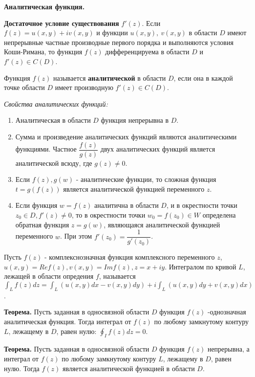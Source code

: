\textbf{Аналитическая функция.}

\textbf{Достаточное условие существования} $f'(z)$.
Если $f(z) = u(x, y) + iv(x, y)$ и функции $u(x, y),~v(x, y)$ в области $D$ имеют непрерывные частные производные первого порядка и выполняются условия Коши-Римана, то функция $f(z)$ дифференцируема в области $D$ и $f'(z) \in C(D)$.

Функция $f(z)$ называется \textbf{аналитической} в области $D$, если она в каждой точке области $D$ имеет производную $f'(z) \in C(D)$.

\textit{Свойства аналитических функций:}
\begin{enumerate}
    \item Аналитическая в области $D$ функция непрерывна в $D$.
    \item Сумма и произведение аналитических функций являются аналитическими функциями. Частное $\dfrac{f(z)}{g(z)}$ двух аналитических функций является аналитической всюду, где $g(z) \neq 0$.
    \item Если $f(z), g(w)$ - аналитические функции, то сложная функция $t = g(f(z))$ является аналитической функцией переменного $z$.
    \item Если функция $w=f(z)$ аналитична в области $D$, и в окрестности точки $z_0 \in D, f'(z) \neq 0$, то в окрестности точки $w_0 = f(z_0) \in W$ определена обратная функция $z=g(w)$, являющаяся аналитической функцией переменного $w$. При этом $f'(z_0) = \dfrac{1}{g'(z_0)}$.
\end{enumerate}

Пусть $f(z)$ - комплекснозначная функция комплексного переменного $z$, $u(x,y) = Re f(z), v(x, y) = Im f(z), z = x + iy$. Интегралом по кривой $L$, лежащей в области опредения $f$, называется $\int_L f(z) dz = \int_L (u(x,y) dx - v(x, y) dy) + i \int_L (u(x,y) dy + v(x, y) dx)$.

\textbf{Теорема.} 
Пусть заданная в односвязной области $D$ функция $f(z)$ -однозначная аналитическая функция. Тогда интеграл от $f(z)$ по любому замкнутому контуру $L$, лежащему в $D$, равен нулю: $\oint_I f(z) dz = 0$.

\textbf{Теорема.}
Пусть заданная в односвязной области $D$ функция $f(z)$ непрерывна, а интеграл от $f(z)$ по любому замкнутому контуру $L$, лежащему в $D$, равен нулю. Тогда $f(z)$ является аналитической функцией в области $D$.


